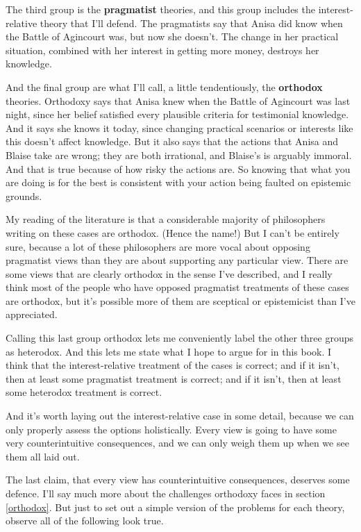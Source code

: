 \documentclass[11pt,]{book}
\begin{document}
The third group is the \textbf{pragmatist} theories, and this group includes the interest-relative theory that I'll defend. The pragmatists say that Anisa did know when the Battle of Agincourt was, but now she doesn't. The change in her practical situation, combined with her interest in getting more money, destroys her knowledge.

And the final group are what I'll call, a little tendentiously, the \textbf{orthodox} theories. Orthodoxy says that Anisa knew when the Battle of Agincourt was last night, since her belief satisfied every plausible criteria for testimonial knowledge. And it says she knows it today, since changing practical scenarios or interests like this doesn't affect knowledge. But it also says that the actions that Anisa and Blaise take are wrong; they are both irrational, and Blaise's is arguably immoral. And that is true because of how risky the actions are. So knowing that what you are doing is for the best is consistent with your action being faulted on epistemic grounds.

My reading of the literature is that a considerable majority of philosophers writing on these cases are orthodox. (Hence the name!) But I can't be entirely sure, because a lot of these philosophers are more vocal about opposing pragmatist views than they are about supporting any particular view. There are some views that are clearly orthodox in the sense I've described, and I really think most of the people who have opposed pragmatist treatments of these cases are orthodox, but it's possible more of them are sceptical or epistemicist than I've appreciated.

Calling this last group orthodox lets me conveniently label the other three groups as heterodox. And this lets me state what I hope to argue for in this book. I think that the interest-relative treatment of the cases is correct; and if it isn't, then at least some pragmatist treatment is correct; and if it isn't, then at least some heterodox treatment is correct.

And it's worth laying out the interest-relative case in some detail, because we can only properly assess the options holistically. Every view is going to have some very counterintuitive consequences, and we can only weigh them up when we see them all laid out.

The last claim, that every view has counterintuitive consequences, deserves some defence. I'll say much more about the challenges orthodoxy faces in section \ref{orthodox}. But just to set out a simple version of the problems for each theory, observe all of the following look true.
\end{document}
